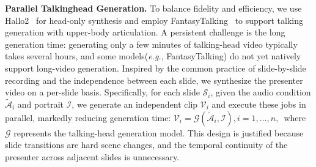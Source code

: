\vspace{-0.4\baselineskip}
\noindent\textbf{Parallel Talkinghead Generation.} 
To balance fidelity and efficiency, we use Hallo2~\cite{cui2024hallo2} for head-only synthesis and employ FantasyTalking~\cite{fantasytalking} to support talking generation with upper-body articulation.
A persistent challenge is the long generation time: generating only a few minutes of talking-head video typically takes several hours, and some models(\textit{e.g.}, FantasyTalking) do not yet natively support long-video generation. 
Inspired by the common practice of slide-by-slide recording and the independence between each slide, we synthesize the presenter video on a per-slide basis. Specifically, for each slide $\mathcal{S}_i$, given the audio condition $\widetilde{\mathcal{A}}_i$ and portrait $\mathcal{I}$, we generate an independent clip $\mathcal{V}_i$ and execute these jobs in parallel, markedly reducing generation time: \begingroup \small $\mathcal{V}_i = \mathcal{G}\!\left(\widetilde{\mathcal{A}}_i, \mathcal{I}\right), i=1,\ldots,n,$\endgroup ~where $\mathcal{G}$ represents the talking-head generation model.
This design is justified because slide transitions are hard scene changes, and the temporal continuity of the presenter across adjacent slides is unnecessary.

\vspace{-0.5\baselineskip} 

